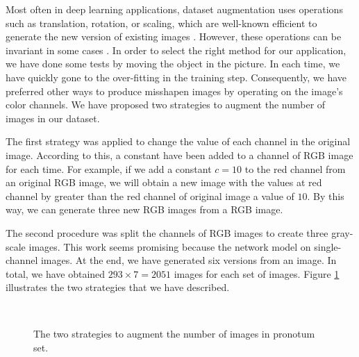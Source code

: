\documentclass[review]{elsarticle}
\begin{document}
Most often in deep learning applications, dataset augmentation uses operations such as translation, rotation, or scaling, which are well-known efficient to generate the new version of existing images \cite{krizhevsky2012imagenet, shorten2019survey}. However, these operations can be invariant in some cases \cite{shorten2019survey}. In order to select the right method for our application, we have done some tests by moving the object in the picture. In each time, we have quickly gone to the over-fitting in the training step. Consequently, we have preferred other ways to produce misshapen images by operating on the image's color channels. We have proposed two strategies to augment the number of images in our dataset.

The first strategy was applied to change the value of each channel in the original image. According to this, a constant have been added to a channel of RGB image for each time. For example, if we add a constant $c = 10$ to the red channel from an original RGB image, we will obtain a new image with the values at red channel by greater than the red channel of original image a value of $10$. By this way, we can generate three new RGB images from a RGB image.

The second procedure was split the channels of RGB images to create three gray-scale images. This work seems promising because the network model on single-channel images. At the end, we have generated six versions from an image. In total, we have obtained $293 \times 7 = 2051$ images for each set of images. Figure \ref{figdataauge} illustrates the two strategies that we have described.

\begin{figure}[h!]
    \centering
    ~~
    \caption{The two strategies to augment the number of images in pronotum set.}
    \label{figdataauge}
\end{figure}
\end{document}
